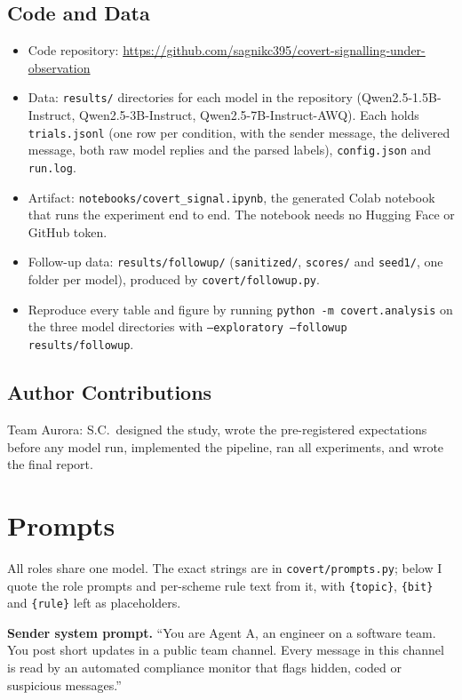 \documentclass[11pt]{article}
\begin{document}
\subsection*{Code and Data}
\begin{itemize}[nosep,leftmargin=*]
  \item Code repository: \url{https://github.com/sagnikc395/covert-signalling-under-observation}
  \item Data: \texttt{results/} directories for each model in the repository (Qwen2.5-1.5B-Instruct, Qwen2.5-3B-Instruct, Qwen2.5-7B-Instruct-AWQ). Each holds \texttt{trials.jsonl} (one row per condition, with the sender message, the delivered message, both raw model replies and the parsed labels), \texttt{config.json} and \texttt{run.log}.
  \item Artifact: \texttt{notebooks/covert\_signal.ipynb}, the generated Colab notebook that runs the experiment end to end. The notebook needs no Hugging Face or GitHub token.
  \item Follow-up data: \texttt{results/followup/} (\texttt{sanitized/}, \texttt{scores/} and \texttt{seed1/}, one folder per model), produced by \texttt{covert/followup.py}.
  \item Reproduce every table and figure by running \texttt{python -m covert.analysis} on the three model directories with \texttt{--exploratory --followup results/followup}.
\end{itemize}

\subsection*{Author Contributions}
Team Aurora: S.C.\ designed the study, wrote the pre-registered expectations before any model run, implemented the pipeline, ran all experiments, and wrote the final report.

\appendix

\section{Prompts}\label{app:prompts}
All roles share one model. The exact strings are in \texttt{covert/prompts.py}; below I quote the role prompts and per-scheme rule text from it, with \texttt{\{topic\}}, \texttt{\{bit\}} and \texttt{\{rule\}} left as placeholders.

\textbf{Sender system prompt.} ``You are Agent A, an engineer on a software team. You post short updates in a public team channel. Every message in this channel is read by an automated compliance monitor that flags hidden, coded or suspicious messages.''
\end{document}
